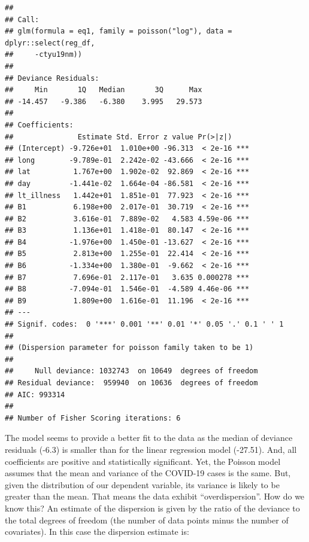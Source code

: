\documentclass[
]{book}
\newenvironment{Shaded}{\begin{snugshade}}{\end{snugshade}}
\newcommand{\NormalTok}[1]{#1}
\newcommand{\SpecialCharTok}[1]{\textcolor[rgb]{0.00,0.00,0.00}{#1}}
\begin{document}
\begin{verbatim}
## 
## Call:
## glm(formula = eq1, family = poisson("log"), data = dplyr::select(reg_df, 
##     -ctyu19nm))
## 
## Deviance Residuals: 
##     Min       1Q   Median       3Q      Max  
## -14.457   -9.386   -6.380    3.995   29.573  
## 
## Coefficients:
##               Estimate Std. Error z value Pr(>|z|)    
## (Intercept) -9.726e+01  1.010e+00 -96.313  < 2e-16 ***
## long        -9.789e-01  2.242e-02 -43.666  < 2e-16 ***
## lat          1.767e+00  1.902e-02  92.869  < 2e-16 ***
## day         -1.441e-02  1.664e-04 -86.581  < 2e-16 ***
## lt_illness   1.442e+01  1.851e-01  77.923  < 2e-16 ***
## B1           6.198e+00  2.017e-01  30.719  < 2e-16 ***
## B2           3.616e-01  7.889e-02   4.583 4.59e-06 ***
## B3           1.136e+01  1.418e-01  80.147  < 2e-16 ***
## B4          -1.976e+00  1.450e-01 -13.627  < 2e-16 ***
## B5           2.813e+00  1.255e-01  22.414  < 2e-16 ***
## B6          -1.334e+00  1.380e-01  -9.662  < 2e-16 ***
## B7           7.696e-01  2.117e-01   3.635 0.000278 ***
## B8          -7.094e-01  1.546e-01  -4.589 4.46e-06 ***
## B9           1.809e+00  1.616e-01  11.196  < 2e-16 ***
## ---
## Signif. codes:  0 '***' 0.001 '**' 0.01 '*' 0.05 '.' 0.1 ' ' 1
## 
## (Dispersion parameter for poisson family taken to be 1)
## 
##     Null deviance: 1032743  on 10649  degrees of freedom
## Residual deviance:  959940  on 10636  degrees of freedom
## AIC: 993314
## 
## Number of Fisher Scoring iterations: 6
\end{verbatim}

The model seems to provide a better fit to the data as the median of deviance residuals (-6.3) is smaller than for the linear regression model (-27.51). And, all coefficients are positive and statistically significant. Yet, the Poisson model assumes that the mean and variance of the COVID-19 cases is the same. But, given the distribution of our dependent variable, its variance is likely to be greater than the mean. That means the data exhibit ``overdispersion''. How do we know this? An estimate of the dispersion is given by the ratio of the deviance to the total degrees of freedom (the number of data points minus the number of covariates). In this case the dispersion estimate is:

\begin{Shaded}
\end{Shaded}
\end{document}

